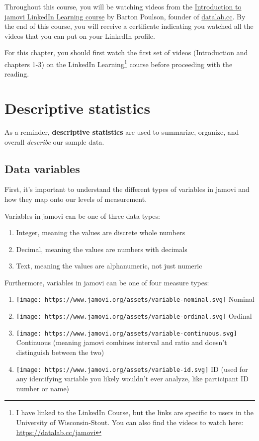 \documentclass[
]{book}
\begin{document}
Throughout this course, you will be watching videos from the \href{https://www.linkedin.com/learning/introduction-to-jamovi/}{Introduction to jamovi LinkedIn Learning course} by Barton Poulson, founder of \href{https://datalab.cc/jamovi/}{datalab.cc}. By the end of this course, you will receive a certificate indicating you watched all the videos that you can put on your LinkedIn profile.

For this chapter, you should first watch the first set of videos (Introduction and chapters 1-3) on the LinkedIn Learning\footnote{I have linked to the LinkedIn Course, but the links are specific to users in the University of Wisconsin-Stout. You can also find the videos to watch here: \url{https://datalab.cc/jamovi}} course before proceeding with the reading.

\hypertarget{descriptive-statistics}{%
\section{Descriptive statistics}\label{descriptive-statistics}}

As a reminder, \textbf{descriptive statistics} are used to summarize, organize, and overall \emph{describe} our sample data.

\hypertarget{data-variables}{%
\subsection{Data variables}\label{data-variables}}

First, it's important to understand the different types of variables in jamovi and how they map onto our levels of measurement.

Variables in jamovi can be one of three data types:

\begin{enumerate}
\def\labelenumi{\arabic{enumi}.}
\item
  Integer, meaning the values are discrete whole numbers
\item
  Decimal, meaning the values are numbers with decimals
\item
  Text, meaning the values are alphanumeric, not just numeric
\end{enumerate}

Furthermore, variables in jamovi can be one of four measure types:

\begin{enumerate}
\def\labelenumi{\arabic{enumi}.}
\item
  \texttt{[image: https://www.jamovi.org/assets/variable-nominal.svg]} Nominal
\item
  \texttt{[image: https://www.jamovi.org/assets/variable-ordinal.svg]} Ordinal
\item
  \texttt{[image: https://www.jamovi.org/assets/variable-continuous.svg]} Continuous (meaning jamovi combines interval and ratio and doesn't distinguish between the two)
\item
  \texttt{[image: https://www.jamovi.org/assets/variable-id.svg]} ID (used for any identifying variable you likely wouldn't ever analyze, like participant ID number or name)
\end{enumerate}
\end{document}
